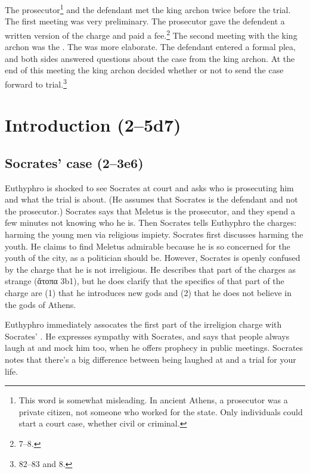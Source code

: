 \documentclass[11pt]{article}
\begin{document}
The prosecutor\footnote{This word is somewhat misleading.  In ancient
Athens, a prosecutor was a private citizen, not someone who worked for the
state.  Only individuals could start a court case, whether civil or
criminal.} and the defendant met the king archon twice before the trial.
The first meeting was very preliminary.  The prosecutor gave the defendent
a written version of the charge and paid a fee.\footnote
{\citet{brickhouse2004} 7--8.}  The second meeting with the king archon was
the .  The  was more elaborate.  The
defendant entered a formal plea, and both sides answered questions about
the case from the king archon.  At the end of this meeting the king archon
decided whether or not to send the case forward to trial.\footnote
{\citet{burnet1924} 82--83 and \citet{brickhouse2004} 8.}

\section{Introduction (2--5d7)}

\subsection{Socrates' case (2--3e6)}

Euthyphro is shocked to see Socrates at court and asks who is prosecuting
him and what the trial is about.  (He assumes that Socrates is the
defendant and not the prosecutor.)  Socrates says that Meletus is the
prosecutor, and they spend a few minutes not knowing who he is.  Then
Socrates tells Euthyphro the charges: harming the young men via religious
impiety.  Socrates first discusses harming the youth.  He claims to find
Meletus admirable because he is so concerned for the youth of the city, as
a politician should be.  However, Socrates is openly confused by the charge
that he is not irreligious.  He describes that part of the charges as
strange (ἄτοπα 3b1), but he does clarify that the specifics of that part of
the charge are (1) that he introduces new gods and (2) that he does not
believe in the gods of Athens.

Euthyphro immediately assocates the first part of the irreligion charge
with Socrates' .  He expresses sympathy with Socrates,
and says that people always laugh at and mock him too, when he offers
prophecy in public meetings.  Socrates notes that there's a big difference
between being laughed at and a trial for your life.
\end{document}
